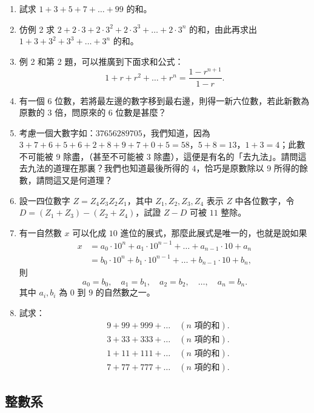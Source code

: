 \begin{enumerate}[1., leftmargin=2em]
  \item 試求 $1+3+5+7+\dots+99$ 的和。
  \item 仿例 2 求 $2+2\cdot 3+2\cdot 3^2+2\cdot 3^3+\dots+2\cdot 3^n$ 的和，由此再求出 $1+3+3^2+3^3+\dots+3^n$ 的和。
  \item 例 2 和第 2 題，可以推廣到下面求和公式：
  \begin{equation*}
    1+r+r^2+\dots+r^n = \frac{1-r^{n+1}}{1-r}.
  \end{equation*}
  \item 有一個 $6$ 位數，若將最左邊的數字移到最右邊，則得一新六位數，若此新數為原數的 $3$ 倍，問原來的 $6$ 位數是甚麼？
  \item 考慮一個大數字如：$37656289705$，我們知道，因為 $3+7+6+5+6+2+8+9+7+0+5=58$，$5+8=13$，$1+3=4$；此數不可能被 $9$ 除盡，（甚至不可能被 $3$ 除盡），這便是有名的「去九法」。請問這去九法的道理在那裏？我們也知道最後所得的 $4$，恰巧是原數除以 $9$ 所得的餘數，請問這又是何道理？
  \item 設一四位數字 $Z = Z_4 Z_3 Z_2 Z_1$，其中 $Z_1, Z_2, Z_3, Z_4$ 表示 $Z$ 中各位數字，令 $D = (Z_1+Z_3)-(Z_2+Z_4)$，試證 $Z-D$ 可被 $11$ 整除。
  \item 有一自然數 $x$ 可以化成 $10$ 進位的展式，那麼此展式是唯一的，也就是說如果
  \begin{align*}
    x &= a_0 \cdot 10^n + a_1 \cdot 10^{n-1} + \dots + a_{n-1} \cdot 10 + a_n \\
    &= b_0 \cdot 10^n + b_1 \cdot 10^{n-1} + \dots + b_{n-1} \cdot 10 + b_n,
  \end{align*}
  則
  \begin{equation*}
    a_0 = b_0, \quad a_1 = b_1, \quad a_2 = b_2, \quad \dots, \quad a_n = b_n.
  \end{equation*}
  其中 $a_i, b_i$ 為 $0$ 到 $9$ 的自然數之一。
  \item 試求：
  \begin{align*}
    & 9+99+999+\dots \quad (n\text{ 項的和}). \\
    & 3+33+333+\dots \quad (n\text{ 項的和}). \\
    & 1+11+111+\dots \quad (n\text{ 項的和}). \\
    & 7+77+777+\dots \quad (n\text{ 項的和}).
  \end{align*}
\end{enumerate}

\subsection{整數系}\label{sec:3-3}

